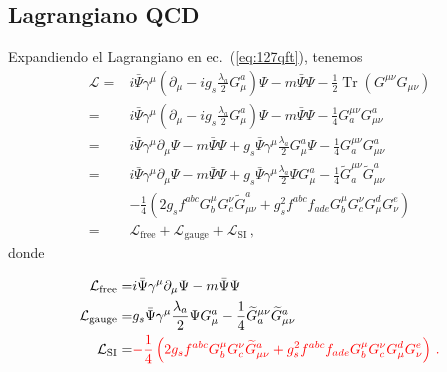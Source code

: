 \begin{frame}
\end{frame}
\subsection{Lagrangiano QCD}

\begin{frame}
Expandiendo el Lagrangiano en ec.~(\ref{eq:127qft}), tenemos
\begin{align}
  \mathcal{L}=&i\bar{\Psi}\gamma^\mu\left(\partial_\mu-i g_s\frac{\lambda_a}{2}G_\mu^a\right)\Psi
  -m\bar{\Psi}\Psi- \frac{1}{2}\operatorname{Tr}\left(G^{\mu\nu} G_{\mu\nu}\right)\nonumber\\
  =&i\bar{\Psi}\gamma^\mu\left(\partial_\mu-i g_s\frac{\lambda_a}{2}G_\mu^a\right)\Psi
  -m\bar{\Psi}\Psi- \frac{1}{4}G^{\mu\nu}_a G_{\mu\nu}^a\nonumber\\
=&i\bar{\Psi}\gamma^\mu\partial_\mu\Psi-m\bar{\Psi}\Psi+g_s\bar{\Psi}\gamma^\mu\frac{\lambda_a}{2}G_\mu^a\Psi
  - \frac{1}{4}G^{\mu\nu}_a G_{\mu\nu}^a\nonumber\\
=&i\bar{\Psi}\gamma^\mu\partial_\mu\Psi-m\bar{\Psi}\Psi+g_s\bar{\Psi}\gamma^\mu\frac{\lambda_a}{2}\Psi G_\mu^a
  - \frac{1}{4}\widetilde{G}^{\mu\nu}_a \widetilde{G}_{\mu\nu}^a\nonumber\\
  &- \frac{1}{4}\left(%
    2g_sf^{a b c}G_b^\mu G_c^\nu\widetilde{G}_{\mu\nu}^a
    +g_s^2f^{a b c}f_{a d e}G_b^\mu G_c^\nu G^d_\mu G^e_\nu\right)\nonumber\\
=&\mathcal{L}_{\text{free}}+\mathcal{L}_{\text{gauge}}+\mathcal{L}_{\text{SI}}\,,
\end{align}
donde

\begin{align}
\label{eq:qcdgauge}
\mathcal{L}_{\text{free}}=&i\bar{\Psi}\gamma^\mu\partial_\mu\Psi-m\bar{\Psi}\Psi\nonumber\\
  \mathcal{L}_{\text{gauge}}=&g_s\bar{\Psi}\gamma^\mu\frac{\lambda_a}{2}\Psi G_\mu^a
  - \frac{1}{4}\widetilde{G}^{\mu\nu}_a \widetilde{G}_{\mu\nu}^a\nonumber\\
  \mathcal{L}_{\text{SI}}=&{\color{red}- \frac{1}{4}\left(%
    2 g_sf^{a b c}G_b^\mu G_c^\nu\widetilde{G}_{\mu\nu}^a
    +g_s^2f^{a b c}f_{a d e}G_b^\mu G_c^\nu G^d_\mu G^e_\nu\right)\,.}
\end{align}


\end{frame}
